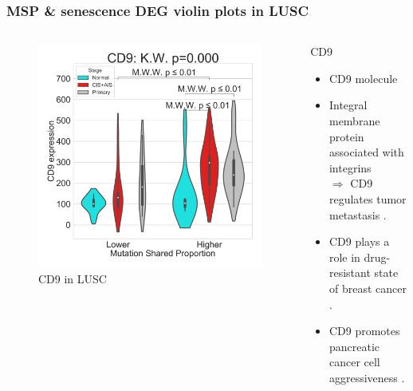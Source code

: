 \documentclass{beamer}
\begin{document}
                \begin{frame}[allowframebreaks]
                    \frametitle{MSP \& senescence DEG violin plots in LUSC}

                    \begin{columns}
                        \begin{column}{0.4 \textwidth}
                            \begin{figure}
                                \includegraphics[width=\linewidth]{figures/DEG/Violin/STAR.TPM.SQC.MSP-Median.senescence/Mutation Shared Proportion_CD9.pdf}
                                \caption{CD9 in LUSC}
                            \end{figure}
                        \end{column}
                        \begin{column}{0.55 \textwidth}
                            \begin{block}{CD9}
                                \begin{itemize}
                                    \item CD9 molecule
                                    \item Integral membrane protein associated with integrins \\
                                    $\Rightarrow$ CD9 regulates tumor metastasis \cite{CD9-01, CD9-02}.
                                    \item CD9 plays a role in drug-resistant state of breast cancer \cite{CD9-03}.
                                    \item CD9 promotes pancreatic cancer cell aggressiveness \cite{CD9-04}.
                                \end{itemize}
                            \end{block}
                        \end{column}
                    \end{columns}


\end{frame}
\end{document}
